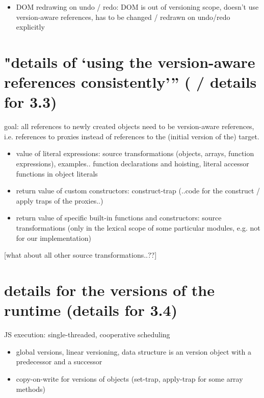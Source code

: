 \begin{itemize}
    \item DOM redrawing on undo / redo: DOM is out of versioning scope, doesn’t use version-aware references, has to be changed / redrawn on undo/redo explicitly
\end{itemize}




\section{"details of ‘using the version-aware references consistently’” ( / details for 3.3)}

goal: all references to newly created objects need to be version-aware references, i.e. references to proxies instead of references to the (initial version of the) target. 

\begin{itemize}
    \item value of literal expressions: source transformations (objects, arrays, function expressions), examples.. function declarations and hoisting, literal accessor functions in object literals
    \item return value of custom constructors: construct-trap (..code for the construct / apply traps of the proxies..)
    \item return value of specific built-in functions and constructors: source transformations (only in the lexical scope of some particular modules, e.g. not for our implementation)
\end{itemize}

[what about all other source transformations..??]




\section{details for the versions of the runtime (details for 3.4)}

JS execution: single-threaded, cooperative scheduling 

\begin{itemize}
    \item global versions, linear versioning, data structure is an version object with a predecessor and a successor
    \item copy-on-write for versions of objects (set-trap, apply-trap for some array methods)
\end{itemize}


